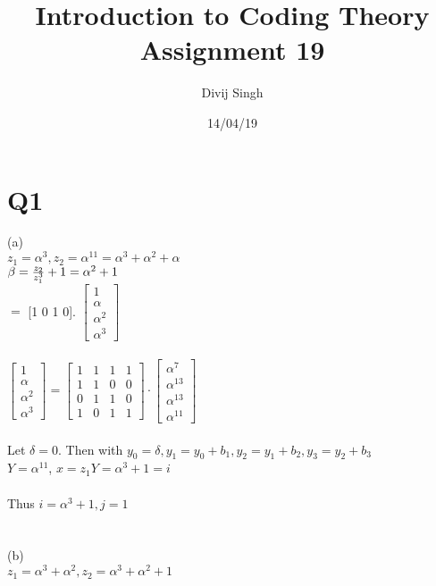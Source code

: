 \documentclass{article}
\title{Introduction to Coding Theory Assignment 19}
\author{Divij Singh}
\date{14/04/19}
\begin{document}
	\maketitle
	
	\section{Q1}
	(a) \\
$z_1 = \alpha^3, z_2 = \alpha^{11} = \alpha^3 + \alpha^2 + \alpha$\\
$\beta = \frac{z_2}{z_1^3} + 1\\
= \alpha^2 + 1$\\
$=$ [1 0 1 0]. $\begin{bmatrix} 1\\ \alpha \\ \alpha^2 \\ \alpha^3 \end{bmatrix}$\\\\
$\left[ \begin{array}{c}{1} \\ {\alpha} \\ {\alpha^{2}} \\ {\alpha^{3}}\end{array}\right]=\left[ \begin{array}{llll}{1} & {1} & {1} & {1} \\ {1} & {1} & {0} & {0} \\ {0} & {1} & {1} & {0} \\ {1} & {0} & {1} & {1}\end{array}\right] \cdot \left[ \begin{array}{c}{\alpha^{7}} \\ {\alpha^{13}} \\ {\alpha^{13}} \\ {\alpha^{11}}\end{array}\right]$\\\\
Let $\delta = 0.$ Then with $y_0 = \delta, y_1 = y_0 + b_1, y_2 = y_1 + b_2, y_3 = y_2 + b_3$\\
$Y = \alpha^{11}$, $x = z_1 Y = \alpha^3 + 1 = i$\\\\
Thus $i= \alpha^3 + 1,j = 1$\\\\\\
(b)\\
$z_1 = \alpha^3 + \alpha^2, z_2 = \alpha^3 + \alpha^2 + 1$\\
\end{document}
